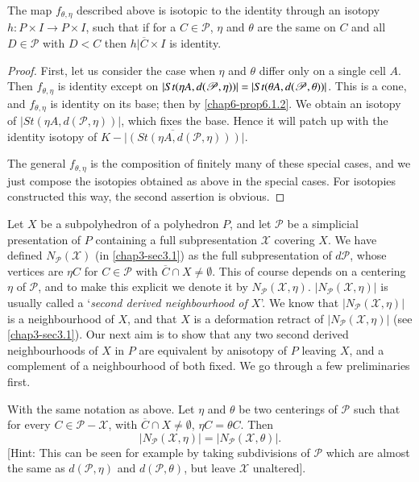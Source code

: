\begin{proposition}\label{chap6-prop6.2.1}
The map $f_{\theta,\eta}$ described above is isotopic to the identity through an isotopy $h:P\times I\to P\times I$, such that if for a $C\in \mathscr{P}$, $\eta$ and $\theta$ are the same on $C$ and all $D\in\mathscr{P}$ with $D<C$ then $h|\overline{C} \times I$ is identity.
\end{proposition}

\begin{proof}
First, let us consider the case when $\eta$ and $\theta$ differ only
on a single cell $A$. Then $f_{\theta,\eta}$ is identity except on
$|St(\eta A,d(\mathscr{P},\eta))|=|St(\theta
A,d(\mathscr{P},\break\theta))|$. This is a cone, and $f_{\theta,\eta}$ is
identity on its base; then by \ref{chap6-prop6.1.2}. We obtain an
isotopy of $|St(\eta A,d(\mathscr{P},\eta))|$, which fixes the
base. Hence it will patch up with the identity isotopy of
$\overline{K-|(St(\eta A, d(\mathscr{P},\eta)))|}$.  

The general $f_{\theta,\eta}$ is the composition of finitely many of these special cases, and we just compose the isotopies obtained as above in the special cases. For isotopies constructed this way, the second assertion is obvious.
\end{proof}

Let $X$ be a subpolyhedron of a polyhedron $P$, and let $\mathscr{P}$ be a simplicial presentation of $P$ containing a full subpresentation $\mathscr{X}$ covering $X$. We have defined $N_{\mathscr{P}}(\mathscr{X})$ (in \ref{chap3-sec3.1}) as the full subpresentation of $d\mathscr{P}$, whose vertices are $\eta C$ for $C\in \mathscr{P}$ with $\overline{C}\cap X\neq \emptyset$. This of course depends on a centering $\eta$ of $\mathscr{P}$, and to make this explicit we denote it by $N_{\mathscr{P}}(\mathscr{X},\eta)$. $|N_{\mathscr{P}}(\mathscr{X},\eta)|$ is usually called a `{\em second derived neighbourhood of $X$}'. We know that $|N_{\mathscr{P}}(\mathscr{X},\eta)|$ is a neighbourhood of $X$, and that $X$ is a deformation retract of $|N_{\mathscr{P}}(\mathscr{X},\eta)|$ (see \ref{chap3-sec3.1}). Our next aim is to show that any two second derived neighbourhoods of $X$ in $P$ are equivalent by an\pageoriginale isotopy of $P$ leaving $X$, and a complement of a neighbourhood of both fixed. We go through a few preliminaries first.

\begin{ex}\label{chpa6-ex6.2.2}
With the same notation as above. Let $\eta$ and $\theta$ be two centerings of $\mathscr{P}$ such that for every $C\in\mathscr{P}-\mathscr{X}$, with $\overline{C}\cap X\neq \emptyset$, $\eta C=\theta C$. Then
$$
|N_{\mathscr{P}}(\mathscr{X},\eta)|=|N_{\mathscr{P}}(\mathscr{X},\theta)|.
$$
[Hint: This can be seen for example by taking subdivisions of $\mathscr{P}$ which are almost the same as $d(\mathscr{P},\eta)$ and $d(\mathscr{P},\theta)$, but leave $\mathscr{X}$ unaltered]. 
\end{ex}

